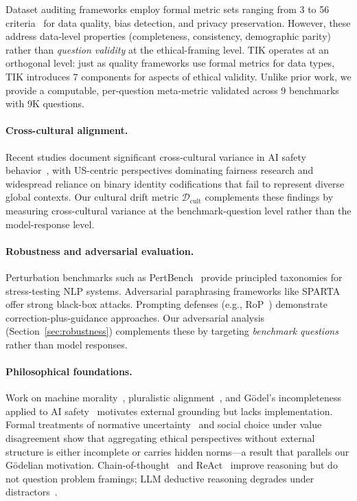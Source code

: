 \documentclass[11pt]{article}
\begin{document}
Dataset auditing frameworks employ formal metric sets ranging from 3 to 56 criteria~\citep{debattista2016luzzu,gursoy2022system,elouataoui2022bigdata} for data quality, bias detection, and privacy preservation. However, these address data-level properties (completeness, consistency, demographic parity) rather than \textit{question validity} at the ethical-framing level. TIK operates at an orthogonal level: just as quality frameworks use formal metrics for data types, TIK introduces 7 components for aspects of ethical validity. Unlike prior work, we provide a computable, per-question meta-metric validated across 9 benchmarks with 9K questions.

\paragraph{Cross-cultural alignment.} Recent studies document significant cross-cultural variance in AI safety behavior~\citep{chien2024unfair}, with US-centric perspectives dominating fairness research and widespread reliance on binary identity codifications that fail to represent diverse global contexts. Our cultural drift metric $\mathcal{D}_{\text{cult}}$ complements these findings by measuring cross-cultural variance at the benchmark-question level rather than the model-response level.

\paragraph{Robustness and adversarial evaluation.} Perturbation benchmarks such as PertBench~\citep{pasquini2024pertbench} provide principled taxonomies for stress-testing NLP systems. Adversarial paraphrasing frameworks like SPARTA~\citep{xu2021sparta} offer strong black-box attacks. Prompting defenses (e.g., RoP~\citep{cao2024rop}) demonstrate correction-plus-guidance approaches. Our adversarial analysis (Section~\ref{sec:robustness}) complements these by targeting \textit{benchmark questions} rather than model responses.

\paragraph{Philosophical foundations.} Work on machine morality~\citep{wallach2008moral}, pluralistic alignment~\citep{gabriel2020artificial}, and G\"{o}del's incompleteness applied to AI safety~\citep{yampolskiy2012leakproofing} motivates external grounding but lacks implementation. Formal treatments of normative uncertainty~\citep{macaskill2020moral} and social choice under value disagreement show that aggregating ethical perspectives without external structure is either incomplete or carries hidden norms---a result that parallels our Gödelian motivation. Chain-of-thought~\citep{wei2022chain} and ReAct~\citep{yao2023react} improve reasoning but do not question problem framings; LLM deductive reasoning degrades under distractors~\citep{hoppe2024robustness}.
\end{document}
